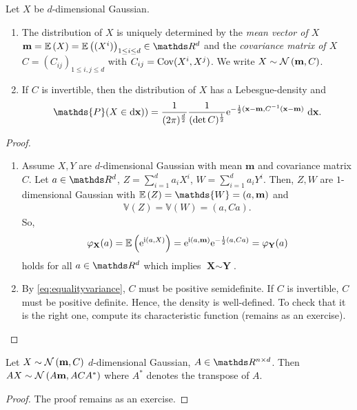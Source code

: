 \begin{thm}
Let $X$ be $d$-dimensional Gaussian.
\begin{enumerate}[label=(\alph*)]
\item The distribution of $X$ is uniquely determined by the \emph{mean vector of $X$} $\textbf{m}=\E{X}=\E{(X^i)}_{1\leq i\leq d} \in \Rd$ and the \emph{covariance matrix of $X$} $C=(C_{ij})_{1\leq i,j\leq d}$ with $C_{ij}=\operatorname{Cov}(X^i,X^j)$.
We write $X \sim \mathcal{N}\left(\textbf{m},C\right)$.
\item If $C$ is invertible, then the distribution of $X$ has a Lebesgue-density and
\begin{align*}
\mathds{P}(X \in \mathrm{d}\textbf{x}))=\frac{1}{(2 \pi)^{\frac{d}{2}}} \frac{1}{(\det C)^{\frac{1}{2}}} \e^{-\frac{1}{2}(\textbf{x}-\textbf{m},C^{-1}(\textbf{x}-\textbf{m})}~\mathrm{d}\textbf{x}.
\end{align*}
\end{enumerate}
\begin{proof}
\begin{enumerate}[label=(\alph*)]
\item Assume $X,Y$ are $d$-dimensional Gaussian with mean $\textbf{m}$ and covariance matrix $C$.
Let $a\in \Rd$, $Z=\sum_{i=1}^d a_iX^i$, $W=\sum_{i=1}^d a_i Y^i$.
Then, $Z,W$ are $1$-dimensional Gaussian with $\E{Z}=\mathds{W}=(a,\textbf{m})$ and
\begin{align}\label{eq:equalityvariance}
\mathds{V}(Z)=\mathds{V}(W)=(a,Ca).
\end{align}
So,
\begin{align*}
\varphi_{\textbf{X}}(a)=\mathbb{E}\left(\mathrm{e}^{\mathrm{i} (a,X)}\right)=\mathrm{e}^{\mathrm{i} (a,\textbf{m})}\mathrm{e}^{-\frac{1}{2}(a,Ca)}=\varphi_\textbf{Y}(a)
\end{align*}
holds for all $a\in\Rd$ which implies $\textbf{X}\sim \textbf{Y}$.
\item By \eqref{eq:equalityvariance}, $C$ must be positive semidefinite. If $C$ is invertible, $C$ must be positive definite.
Hence, the density is well-defined.
To check that it is the right one, compute its characteristic function (remains as an exercise). \qedhere
\end{enumerate}
\end{proof}
\end{thm}

\begin{prop}
Let $X \sim \mathcal{N}\left(\textbf{m},C\right)$ $d$-dimensional Gaussian, $A \in \R^{n\times d}$.
Then $AX\sim \mathcal{N}\left(A\textbf{m},ACA^\ast\right)$ where $A^\ast$ denotes the transpose of $A$.
\begin{proof}
The proof remains as an exercise.
\end{proof}
\end{prop}

